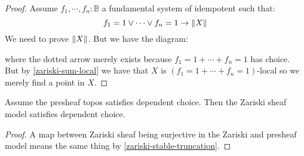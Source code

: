 \begin{proof}
Assume $f_1,\cdots,f_n:\mathbb{B}$ a fundamental system of idempotent such that:
\[f_1=1\lor\cdots\lor f_n=1 \to \lVert X \rVert\]
We need to prove $\lVert X \rVert$. But we have the diagram:
 \begin{center}
  \end{center}
  where the dotted arrow merely exists because $f_1=1+ \cdots + f_n=1$ has choice. But by \cref{zariski-sum-local} we have that $X$ is $(f_1=1+\cdots + f_n=1)$-local so we merely find a point in $X$.
\end{proof}

\begin{proposition}
Assume the presheaf topos satisfies dependent choice. Then the Zariski sheaf model satisfies dependent choice.
\end{proposition}

\begin{proof}
A map between Zariski sheaf being surjective in the Zariski and presheaf model means the same thing by \cref{zariski-stable-truncation}.
\end{proof}


